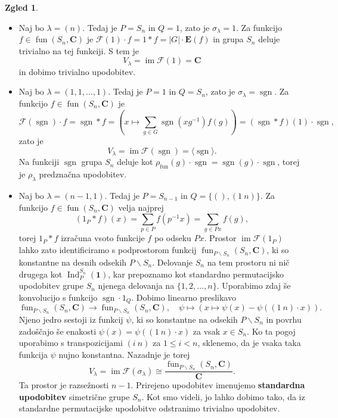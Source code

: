 \documentclass[11pt]{book}
\def\CC{\mathbf{C}}
\def\oneone{\mathbf{1}}
\def\Fcal{\mathcal{F}}
\def\EE{\mathbf{E}}
\def\youngsym{\sigma_{\lambda}}
\DeclareMathOperator\image{im}
\DeclareMathOperator\sgn{sgn}
\DeclareMathOperator\Ind{Ind}
\DeclareMathOperator\fun{fun}
\def\definicija{\color{rdeca}\bf}
\theoremstyle{definition}
\theoremstyle{zgled}
\newtheorem{zgled}[theorem]{Zgled}
\theoremstyle{zgledbrezstevilke}
\theoremstyle{odprtproblem}
\theoremstyle{domacanaloga}
\theoremstyle{izrek}
\begin{document}
\begin{zgled} \leavevmode
\begin{itemize}
    \item Naj bo $\lambda = (n)$. Tedaj je $P = S_n$ in $Q = 1$, zato je $\youngsym = 1$. Za funkcijo $f \in \fun(S_n, \CC)$ je $\Fcal(1) \cdot f = 1 * f = |G| \cdot \EE(f)$ in grupa $S_n$ deluje trivialno na tej funkciji. S tem je
    \[
        V_{\lambda} = \image \Fcal(1) = \CC
    \]
    in dobimo trivialno upodobitev.

    \item Naj bo $\lambda = (1,1,\dots,1)$. Tedaj je $P = 1$ in $Q = S_n$, zato je $\youngsym = \sgn$. Za funkcijo $f \in \fun(S_n, \CC)$ je
    \[
        \Fcal(\sgn) \cdot f = \sgn * f = \left( x \mapsto \sum_{g \in G} \sgn(xg^{-1}) f(g) \right) = (\sgn * f)(1) \cdot \sgn,
    \]
    zato je
    \[
        V_{\lambda} = \image \Fcal(\sgn) = \langle \sgn \rangle.
    \]
    Na funkciji $\sgn$ grupa $S_n$ deluje kot $\rho_{\fun}(g) \cdot \sgn = \sgn(g) \cdot \sgn$, torej je $\rho_{\lambda}$ predznačna upodobitev.
    
    \item Naj bo $\lambda = (n-1,1)$. Tedaj je $P = S_{n-1}$ in $Q = \{ (), (1 \ n)\}$. Za funkcijo $f \in \fun(S_n, \CC)$ velja najprej
    \[
        \left( 1_P * f \right) (x) = \sum_{p \in P} f(p^{-1} x) = \sum_{g \in Px} f(g),
    \]
    torej $1_P * f$ izračuna vsoto funkcije $f$ po odseku $Px$. Prostor $\image \Fcal(1_P)$ lahko zato identificiramo s podprostorom funkcij $\fun_{P \backslash S_n}(S_n, \CC)$, ki so konstantne na desnih odsekih $P \backslash S_n$. Delovanje $S_n$ na tem prostoru ni nič drugega kot $\Ind^{S_n}_P(\oneone)$, kar prepoznamo kot standardno permutacijsko upodobitev grupe $S_n$ njenega delovanja na $\{ 1, 2, \dots, n \}$. Uporabimo zdaj še konvolucijo s funkcijo $\sgn \cdot 1_Q$. Dobimo linearno preslikavo
    \[
        \textstyle \fun_{P \backslash S_n}(S_n, \CC) \to \fun_{P \backslash S_n}(S_n, \CC), \quad
        \psi \mapsto \left( x \mapsto \psi(x) - \psi((1 \ n) \cdot x) \right).
    \]
    Njeno jedro sestoji iz funkcij $\psi$, ki so konstantne na odsekih $P \backslash S_n$ in povrhu zadoščajo še enakosti $\psi(x) = \psi((1 \ n) \cdot x)$ za vsak $x \in S_n$. Ko ta pogoj uporabimo s transpozicijami $(i \ n)$ za $1 \leq i < n$, sklenemo, da je vsaka taka funkcija $\psi$ nujno konstantna. Nazadnje je torej
    \[
        V_{\lambda} = \image \Fcal(\youngsym) \cong \frac{\textstyle \fun_{P \backslash S_n}(S_n, \CC)}{\CC}.
    \]
    Ta prostor je razsežnosti $n-1$. Prirejeno upodobitev imenujemo {\definicija standardna upodobitev} simetrične grupe $S_n$. Kot smo videli, jo lahko dobimo tako, da iz standardne permutacijske upodobitve odstranimo trivialno upodobitev.
\end{itemize}
\end{zgled}
\end{document}

